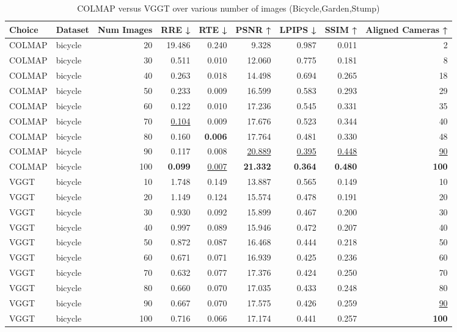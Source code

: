 \begin{table}[H]
\caption{COLMAP versus VGGT over various number of images (Bicycle,Garden,Stump)}
\label{tab:01_num_images_bicycle,garden,stump}
\small
\begin{tabular}{llrrrrrrr}
\toprule
Choice & Dataset & Num Images & RRE ↓ & RTE ↓ & PSNR ↑ & LPIPS ↓ & SSIM ↑ & Aligned Cameras ↑ \\
\midrule
COLMAP & bicycle & 20 & 19.486 & 0.240 & 9.328 & 0.987 & 0.011 & 2 \\
COLMAP & bicycle & 30 & 0.511 & 0.010 & 12.060 & 0.775 & 0.181 & 8 \\
COLMAP & bicycle & 40 & 0.263 & 0.018 & 14.498 & 0.694 & 0.265 & 18 \\
COLMAP & bicycle & 50 & 0.233 & 0.009 & 16.599 & 0.583 & 0.293 & 29 \\
COLMAP & bicycle & 60 & 0.122 & 0.010 & 17.236 & 0.545 & 0.331 & 35 \\
COLMAP & bicycle & 70 & \underline{0.104} & 0.009 & 17.676 & 0.523 & 0.344 & 40 \\
COLMAP & bicycle & 80 & 0.160 & \textbf{0.006} & 17.764 & 0.481 & 0.330 & 48 \\
COLMAP & bicycle & 90 & 0.117 & 0.008 & \underline{20.889} & \underline{0.395} & \underline{0.448} & \underline{90} \\
COLMAP & bicycle & 100 & \textbf{0.099} & \underline{0.007} & \textbf{21.332} & \textbf{0.364} & \textbf{0.480} & \textbf{100} \\
VGGT & bicycle & 10 & 1.748 & 0.149 & 13.887 & 0.565 & 0.149 & 10 \\
VGGT & bicycle & 20 & 1.149 & 0.124 & 15.574 & 0.478 & 0.191 & 20 \\
VGGT & bicycle & 30 & 0.930 & 0.092 & 15.899 & 0.467 & 0.200 & 30 \\
VGGT & bicycle & 40 & 0.997 & 0.089 & 15.946 & 0.472 & 0.207 & 40 \\
VGGT & bicycle & 50 & 0.872 & 0.087 & 16.468 & 0.444 & 0.218 & 50 \\
VGGT & bicycle & 60 & 0.671 & 0.071 & 16.939 & 0.425 & 0.236 & 60 \\
VGGT & bicycle & 70 & 0.632 & 0.077 & 17.376 & 0.424 & 0.250 & 70 \\
VGGT & bicycle & 80 & 0.660 & 0.070 & 17.035 & 0.433 & 0.248 & 80 \\
VGGT & bicycle & 90 & 0.667 & 0.070 & 17.575 & 0.426 & 0.259 & \underline{90} \\
VGGT & bicycle & 100 & 0.716 & 0.066 & 17.174 & 0.441 & 0.257 & \textbf{100} \\

\end{tabular}
\end{table}

